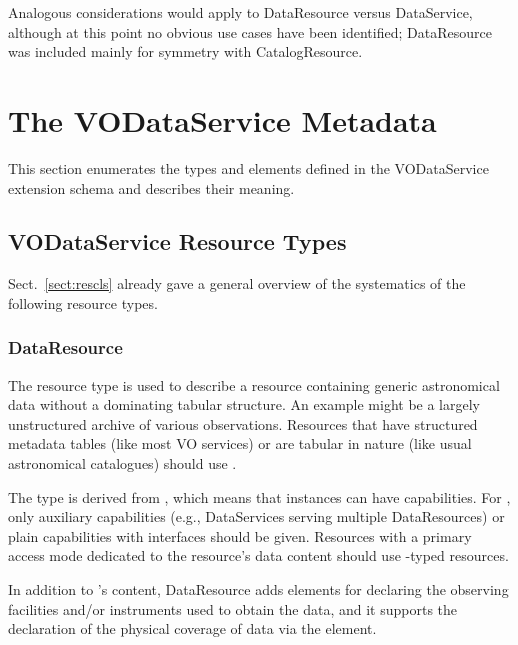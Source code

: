 \documentclass[11pt,a4paper]{ivoa}
\begin{document}
Analogous considerations would apply to DataResource versus DataService,
although at this point no obvious use cases have been identified;
DataResource was included mainly for symmetry with CatalogResource.

\section{The VODataService Metadata}
\label{sect:metadata}


This section enumerates the types and elements defined in the
VODataService extension schema and describes their meaning.


\subsection{VODataService Resource Types}
\label{sect:resext}

Sect.~\ref{sect:rescls} already gave a general overview of the
systematics of the following resource types.

\subsubsection{DataResource}
\label{sect:DataResource}

The  resource type is used to describe a
resource containing generic astronomical data without a dominating
tabular structure.  An example might be a largely unstructured archive
of various observations.  Resources that have structured metadata tables
(like most VO services) or are tabular in nature (like usual
astronomical catalogues) should use .

The type is derived from , which means that instances
can have
capabilities.  For , only auxiliary capabilities
(e.g., DataServices serving multiple DataResources) or plain capabilities
with  interfaces should be given.  Resources with a
primary access mode dedicated to the resource's data content should use
-typed resources.

In addition to 's content, DataResource adds
elements for declaring the observing facilities and/or instruments used
to obtain the data, and it supports the declaration of
the physical coverage of data via the 
element.
\end{document}
